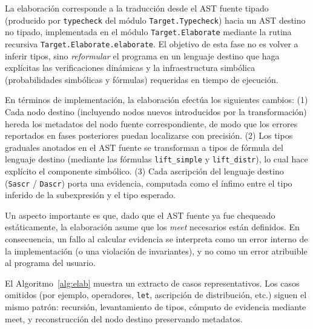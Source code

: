 La elaboración corresponde a la traducción desde el AST fuente
tipado (producido por \verb|typecheck| del módulo \verb|Target.Typecheck|) hacia
un AST destino no tipado, implementada en el módulo
\verb|Target.Elaborate| mediante la rutina recursiva
\verb|Target.Elaborate.elaborate|. El objetivo de esta fase no es
volver a inferir tipos, sino \emph{reformular} el programa en un
lenguaje destino que haga explícitas las verificaciones dinámicas y la
infraestructura simbólica (probabilidades simbólicas y fórmulas)
requeridas en tiempo de ejecución.

En términos de implementación, la elaboración efectúa los
siguientes cambios: {(1)} Cada nodo destino (incluyendo nodos
nuevos introducidos por la transformación) hereda los metadatos del
nodo fuente correspondiente, de modo que los errores reportados en
fases posteriores puedan localizarse con precisión.  {(2)} Los
tipos graduales anotados en el AST fuente se transforman a tipos de
fórmula del lenguaje destino (mediante las fórmulas
\lstinline|lift_simple| y \lstinline|lift_distr|), lo cual hace
explícito el componente simbólico.  {(3)} Cada ascripción del
lenguaje destino (\lstinline|Sascr| / \lstinline|Dascr|) porta una
evidencia, computada como el ínfimo entre el tipo inferido de la
subexpresión y el tipo esperado.

Un aspecto importante es que, dado que el AST fuente ya fue chequeado
estáticamente, la elaboración asume que los \emph{meet} necesarios
están definidos. En consecuencia, un fallo al calcular evidencia se
interpreta como un error interno de la implementación (o una violación
de invariantes), y no como un error atribuible al programa del
usuario.

El Algoritmo~\ref{alg:elab} muestra un extracto de casos
representativos.  Los casos omitidos (por ejemplo, operadores,
\lstinline|let|, ascripción de distribución, etc.)  siguen el mismo
patrón: recursión, levantamiento de tipos, cómputo de evidencia
mediante {meet}, y reconstrucción del nodo destino preservando
metadatos.


